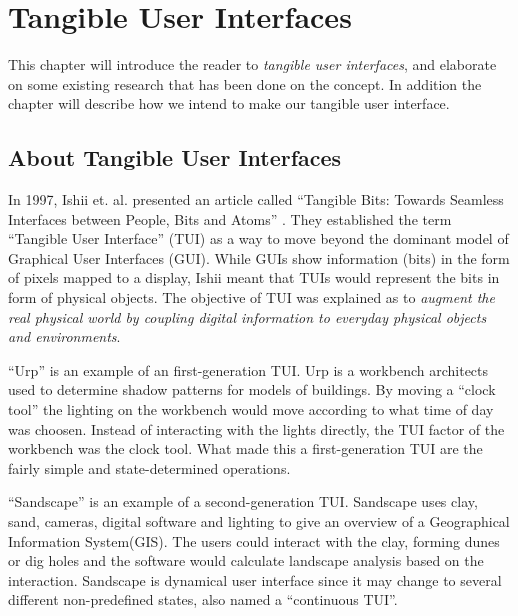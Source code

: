 \chapter{Tangible User Interfaces}
\label{chp:tangibleinterfaces}

This chapter will introduce the reader to \emph{tangible user interfaces}, and elaborate on some existing research that has been done on the concept. In addition the chapter will describe how we intend to make our tangible user interface.   

\section{About Tangible User Interfaces}
\label{sec:abouttuis}

In 1997, Ishii et. al. presented an article called ``Tangible Bits: Towards Seamless Interfaces between People, Bits and Atoms'' \cite{ishii1997tangible}. They established the term ``Tangible User Interface'' (TUI) as a way to move beyond the dominant model of Graphical User Interfaces (GUI). 
While GUIs show information (bits) in the form of pixels mapped to a display, Ishii meant that TUIs would represent the bits in form of physical objects. The objective of TUI was explained as to \emph{augment the real physical world by coupling digital information to everyday physical objects and environments}\cite{ishii1997tangible}. 

``Urp''\cite{underkoffler1999urp} is an example of an first-generation TUI. Urp is a workbench architects used to determine shadow patterns for models of buildings. By moving a ``clock tool'' the lighting on the workbench would move according to what time of day was choosen. Instead of interacting with the lights directly, the TUI factor of the workbench was the clock tool.
What made this a first-generation TUI are the fairly simple and state-determined operations.

``Sandscape''\cite{ishii2004bringing} is an example of a second-generation TUI. Sandscape uses clay, sand, cameras, digital software and lighting to give an overview of a Geographical Information System(GIS). The users could interact with the clay, forming dunes or dig holes and the software would calculate landscape analysis based on the interaction. Sandscape is dynamical user interface since it may change to several different non-predefined states, also named a ``continuous TUI''.

